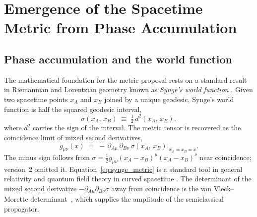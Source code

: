\documentclass[%
 reprint, amsmath,amssymb, aps, prb, ]{revtex4-2}
\numberwithin{equation}{section}
\begin{document}
\section{Emergence of the Spacetime Metric from Phase Accumulation}
\label{sec:metric}

\subsection{Phase accumulation and the world function}
\label{subsec:phasedistance}

The mathematical foundation for the metric proposal rests on a standard result in Riemannian and Lorentzian geometry known as \emph{Synge's world function} \cite{Synge1960}. Given two spacetime points $x_A$ and $x_B$ joined by a unique geodesic, Synge's world function is half the squared geodesic interval,
\begin{equation}
\sigma(x_A,\, x_B) \;\equiv\; \tfrac{1}{2}\,d^2(x_A,\, x_B),
\label{eq:synge_def}
\end{equation}
where $d^2$ carries the sign of the interval. The metric tensor is recovered as the coincidence limit of mixed second derivatives,
\begin{equation}
g_{\mu\nu}(x) \;=\; -\,\partial_{A\mu}\,\partial_{B\nu}\,\sigma(x_A,\, x_B)\Big|_{x_A = x_B = x}.
\label{eq:synge_metric}
\end{equation}
The minus sign follows from $\sigma = \tfrac12 g_{\mu\nu}(x_A - x_B)^\mu(x_A - x_B)^\nu$ near coincidence; version~2 omitted it. Equation~\eqref{eq:synge_metric} is a standard tool in general relativity and quantum field theory in curved spacetime \cite{DeWitt1965, Christensen1976}. The determinant of the mixed second derivative $-\partial_{A\mu}\partial_{B\nu}\sigma$ away from coincidence is the van Vleck--Morette determinant~\cite{VanVleck1928, Morette1951}, which supplies the amplitude of the semiclassical propagator.
\end{document}
